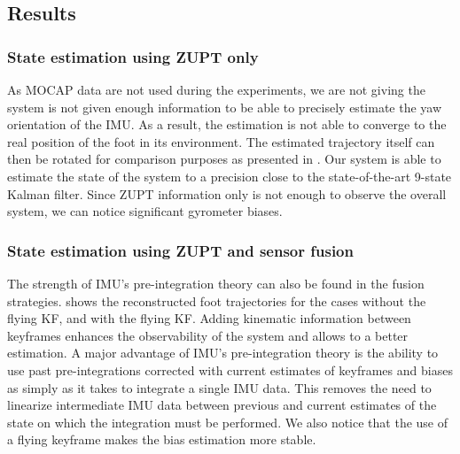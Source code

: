 %

\subsection{Results}
\subsubsection{State estimation using ZUPT only}

As MOCAP data are not used during the experiments, we are not giving the system is not given enough information to be able to precisely estimate the yaw orientation of the IMU. 
As a result, the estimation is not able to converge to the real position of the foot in its environment. The estimated trajectory itself can then be rotated for comparison purposes as presented in .
Our system is able to estimate the state of the system to a precision close to the state-of-the-art 9-state Kalman filter.
Since ZUPT information only is not enough to observe the overall system, we can notice significant gyrometer biases.

\subsubsection{State estimation using ZUPT and sensor fusion}

The strength of IMU's pre-integration theory can also be found in the fusion strategies. 
 shows the reconstructed foot trajectories for the cases without the flying KF, and with the flying KF. Adding kinematic information between keyframes enhances the observability of the system and allows to a better estimation.
A major advantage of IMU's pre-integration theory is the ability to use past pre-integrations corrected with current estimates of keyframes and biases as simply as it takes to integrate a single IMU data. This removes the need to linearize 
intermediate IMU data between previous and current estimates of the state on which the integration must be performed. We also notice that the use of a flying keyframe makes the bias estimation more stable.

